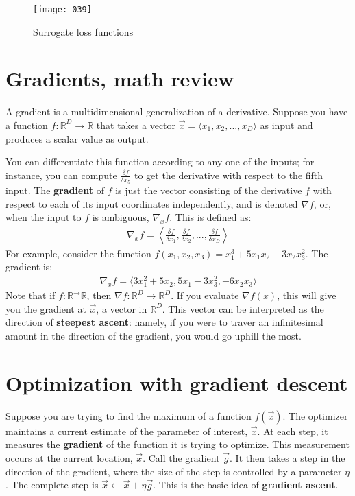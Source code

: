 \begin{figure}[t]
\begin{center}
    \texttt{[image: 039]}
    \vspace*{-25pt}
\end{center}
\caption{Surrogate loss functions}
\label{fig:039}
\end{figure}

\section{Gradients, math review}
A gradient is a multidimensional generalization of a derivative. Suppose you have a function \(f : \mathbb{R}^D \to \mathbb{R}\) that takes a vector \(\vec{x} = \langle x_1, x_2, ..., x_D \rangle \) as input and produces a scalar value as output.

You can differentiate this function according to any one of the inputs; for instance, you can compute \(\frac {\delta f} {\delta x_5}\) to get the derivative with respect to the fifth input. The \textbf{gradient} of \(f\) is just the vector consisting of the derivative \(f\) with respect to each of its input coordinates independently, and is denoted \(\nabla f\), or, when the input to \(f\) is ambiguous, \(\nabla_x f\). This is defined as:
\begin{align}
    \nabla_x f = \left\langle \frac{\delta f}{\delta x_1}, \frac{\delta f}{\delta x_2}, ..., \frac{\delta f}{\delta x_D} \right\rangle
\end{align}
For example, consider the function \(f(x_1,x_2,x_3) = x_1^3+5x_1x_2-3x_2x_3^2\). The gradient is:
\begin{align}
    \nabla_x f = \langle 3x_1^2 + 5x_2, 5x_1-3x_3^2, -6x_2x_3 \rangle
\end{align}
Note that if \(f : \mathbb{R}^ \to \mathbb{R}\), then \(\nabla f : \mathbb{R}^D \to \mathbb{R}^D\). If you evaluate \(\nabla f(x)\), this will give you the gradient at \(\vec{x}\), a vector in \(\mathbb{R}^D\). This vector can be interpreted as the direction of \textbf{steepest ascent}: namely, if you were to traver an infinitesimal amount in the direction of the gradient, you would go uphill the most.

\section{Optimization with gradient descent}
Suppose you are trying to find the maximum of a function \(f(\vec{x})\). The optimizer maintains a current estimate of the parameter of interest, \(\vec{x}\). At each step, it measures the \textbf{gradient} of the function it is trying to optimize. This measurement occurs at the current location, \(\vec{x}\). Call the gradient \(\vec{g}\). It then takes a step in the direction of the gradient, where the size of the step is controlled by a parameter \(\eta\). The complete step is \(\vec{x} \gets \vec{x} + \eta \vec{g}\). This is the basic idea of \textbf{gradient ascent}.

